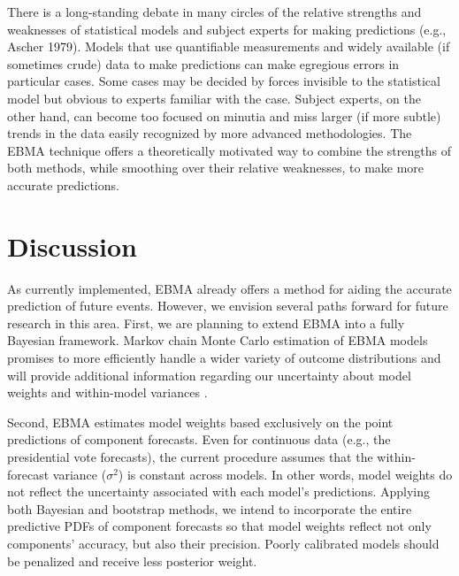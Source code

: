  

There is a long-standing debate in many circles of the relative
strengths and weaknesses of statistical models and subject experts for
making predictions (e.g., Ascher 1979). Models that use quantifiable
measurements and widely available (if sometimes crude) data to make
predictions can make egregious errors in particular cases. Some cases
may be decided by forces invisible to the statistical model but
obvious to experts familiar with the case. Subject experts, on the
other hand, can become too focused on minutia and miss larger (if more
subtle) trends in the data easily recognized by more advanced
methodologies. The EBMA technique offers a theoretically motivated way
to combine the strengths of both methods, while smoothing over their
relative weaknesses, to make more accurate predictions.

\section{Discussion} %

As currently implemented, EBMA already offers a method for aiding the
accurate prediction of future events.  However, we envision several
paths forward for future research in this area. First, we are planning
to extend EBMA into a fully Bayesian framework. Markov chain Monte
Carlo estimation of EBMA models promises to more efficiently handle a
wider variety of outcome distributions and will provide additional
information regarding our uncertainty about model weights and
within-model variances \citep{Vrugt:2008}.

Second, EBMA estimates model weights based exclusively on the point
predictions of component forecasts.  Even for continuous data (e.g.,
the presidential vote forecasts), the current procedure assumes that
the within-forecast variance ($\sigma^2$) is constant across models.
In other words, model weights do not reflect the uncertainty
associated with each model's predictions.  Applying both Bayesian and
bootstrap methods, we intend to incorporate the entire predictive PDFs
of component forecasts so that model weights reflect not only
components' accuracy, but also their precision.  Poorly calibrated
models should be penalized and receive less posterior weight.

